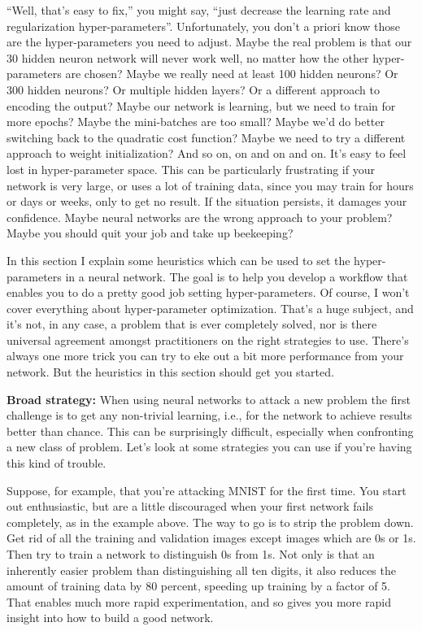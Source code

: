 \documentclass[a4paper,twoside,10pt]{book}
\begin{document}
``Well, that's easy to fix,'' you might say, ``just decrease the learning rate and regularization hyper-parameters''. Unfortunately, you don't a priori know those are the hyper-parameters you need to adjust. Maybe the real problem is that our 30 hidden neuron network will never work well, no matter how the other hyper-parameters are chosen? Maybe we really need at least 100 hidden neurons? Or 300 hidden neurons? Or multiple hidden layers? Or a different approach to encoding the output? Maybe our network is learning, but we need to train for more epochs? Maybe the mini-batches are too small? Maybe we'd do better switching back to the quadratic cost function? Maybe we need to try a different approach to weight initialization? And so on, on and on and on. It's easy to feel lost in hyper-parameter space. This can be particularly frustrating if your network is very large, or uses a lot of training data, since you may train for hours or days or weeks, only to get no result. If the situation persists, it damages your confidence. Maybe neural networks are the wrong approach to your problem? Maybe you should quit your job and take up beekeeping?

In this section I explain some heuristics which can be used to set the hyper-parameters in a neural network. The goal is to help you develop a workflow that enables you to do a pretty good job setting hyper-parameters. Of course, I won't cover everything about hyper-parameter optimization. That's a huge subject, and it's not, in any case, a problem that is ever completely solved, nor is there universal agreement amongst practitioners on the right strategies to use. There's always one more trick you can try to eke out a bit more performance from your network. But the heuristics in this section should get you started.

\textbf{Broad strategy:} When using neural networks to attack a new problem the first challenge is to get any non-trivial learning, i.e., for the network to achieve results better than chance. This can be surprisingly difficult, especially when confronting a new class of problem. Let's look at some strategies you can use if you're having this kind of trouble.

Suppose, for example, that you're attacking MNIST for the first time. You start out enthusiastic, but are a little discouraged when your first network fails completely, as in the example above. The way to go is to strip the problem down. Get rid of all the training and validation images except images which are 0s or 1s. Then try to train a network to distinguish 0s from 1s. Not only is that an inherently easier problem than distinguishing all ten digits, it also reduces the amount of training data by 80 percent, speeding up training by a factor of 5. That enables much more rapid experimentation, and so gives you more rapid insight into how to build a good network.
\end{document}

